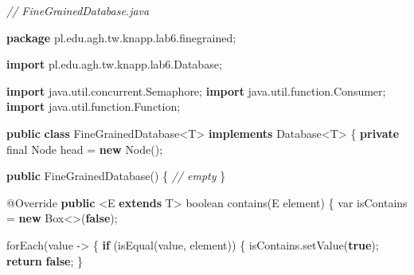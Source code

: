 \documentclass[11pt]{article}
\newenvironment{Shaded}{}{}
\newcommand{\KeywordTok}[1]{\textcolor[rgb]{0.00,0.44,0.13}{\textbf{{#1}}}}
\newcommand{\DataTypeTok}[1]{\textcolor[rgb]{0.56,0.13,0.00}{{#1}}}
\newcommand{\CommentTok}[1]{\textcolor[rgb]{0.38,0.63,0.69}{\textit{{#1}}}}
\newcommand{\FunctionTok}[1]{\textcolor[rgb]{0.02,0.16,0.49}{{#1}}}
\newcommand{\NormalTok}[1]{{#1}}
\newcommand{\ImportTok}[1]{{#1}}
\newcommand{\ControlFlowTok}[1]{\textcolor[rgb]{0.00,0.44,0.13}{\textbf{{#1}}}}
\newcommand{\OperatorTok}[1]{\textcolor[rgb]{0.40,0.40,0.40}{{#1}}}
\newcommand{\BuiltInTok}[1]{{#1}}
\newcommand{\AttributeTok}[1]{\textcolor[rgb]{0.49,0.56,0.16}{{#1}}}
\begin{document}
\begin{Shaded}
\begin{Highlighting}[]
\CommentTok{// FineGrainedDatabase.java}

\KeywordTok{package}\ImportTok{ pl}\OperatorTok{.}\ImportTok{edu}\OperatorTok{.}\ImportTok{agh}\OperatorTok{.}\ImportTok{tw}\OperatorTok{.}\ImportTok{knapp}\OperatorTok{.}\ImportTok{lab6}\OperatorTok{.}\ImportTok{finegrained}\OperatorTok{;}

\KeywordTok{import} \ImportTok{pl}\OperatorTok{.}\ImportTok{edu}\OperatorTok{.}\ImportTok{agh}\OperatorTok{.}\ImportTok{tw}\OperatorTok{.}\ImportTok{knapp}\OperatorTok{.}\ImportTok{lab6}\OperatorTok{.}\ImportTok{Database}\OperatorTok{;}

\KeywordTok{import} \ImportTok{java}\OperatorTok{.}\ImportTok{util}\OperatorTok{.}\ImportTok{concurrent}\OperatorTok{.}\ImportTok{Semaphore}\OperatorTok{;}
\KeywordTok{import} \ImportTok{java}\OperatorTok{.}\ImportTok{util}\OperatorTok{.}\ImportTok{function}\OperatorTok{.}\ImportTok{Consumer}\OperatorTok{;}
\KeywordTok{import} \ImportTok{java}\OperatorTok{.}\ImportTok{util}\OperatorTok{.}\ImportTok{function}\OperatorTok{.}\ImportTok{Function}\OperatorTok{;}

\KeywordTok{public} \KeywordTok{class}\NormalTok{ FineGrainedDatabase}\OperatorTok{\textless{}}\NormalTok{T}\OperatorTok{\textgreater{}} \KeywordTok{implements}\NormalTok{ Database}\OperatorTok{\textless{}}\NormalTok{T}\OperatorTok{\textgreater{}} \OperatorTok{\{}
    \KeywordTok{private} \DataTypeTok{final} \BuiltInTok{Node}\NormalTok{ head }\OperatorTok{=} \KeywordTok{new} \BuiltInTok{Node}\OperatorTok{();}

    \KeywordTok{public} \FunctionTok{FineGrainedDatabase}\OperatorTok{()} \OperatorTok{\{}
        \CommentTok{// empty}
    \OperatorTok{\}}

    \AttributeTok{@Override}
    \KeywordTok{public} \OperatorTok{\textless{}}\NormalTok{E }\KeywordTok{extends}\NormalTok{ T}\OperatorTok{\textgreater{}} \DataTypeTok{boolean} \FunctionTok{contains}\OperatorTok{(}\NormalTok{E element}\OperatorTok{)} \OperatorTok{\{}
        \DataTypeTok{var}\NormalTok{ isContains }\OperatorTok{=} \KeywordTok{new} \BuiltInTok{Box}\OperatorTok{\textless{}\textgreater{}(}\KeywordTok{false}\OperatorTok{);}

        \FunctionTok{forEach}\OperatorTok{(}\NormalTok{value }\OperatorTok{{-}\textgreater{}} \OperatorTok{\{}
            \ControlFlowTok{if} \OperatorTok{(}\FunctionTok{isEqual}\OperatorTok{(}\NormalTok{value}\OperatorTok{,}\NormalTok{ element}\OperatorTok{))} \OperatorTok{\{}
\NormalTok{                isContains}\OperatorTok{.}\FunctionTok{setValue}\OperatorTok{(}\KeywordTok{true}\OperatorTok{);}
                \ControlFlowTok{return} \KeywordTok{false}\OperatorTok{;}
            \OperatorTok{\}}


\end{Highlighting}
\end{Shaded}
\end{document}
